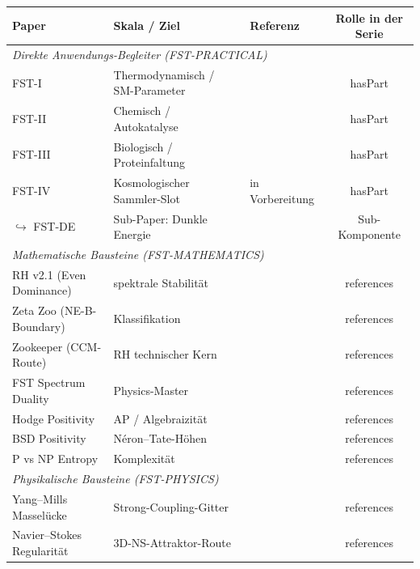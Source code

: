 \documentclass[11pt,a4paper]{article}
\theoremstyle{remark}
\begin{document}
\begin{table}[h]
\centering
\renewcommand{\arraystretch}{1.18}
\small
\begin{tabular}{lllc}
\toprule
\textbf{Paper} & \textbf{Skala / Ziel} & \textbf{Referenz} &
\textbf{Rolle in der Serie} \\
\midrule
\multicolumn{4}{l}{\textit{Direkte Anwendungs-Begleiter (FST-PRACTICAL)}} \\
FST-I   & Thermodynamisch / SM-Parameter      & \cite{GeigerFST-I-2026}     & hasPart \\
FST-II  & Chemisch / Autokatalyse             & \cite{GeigerFST-II-2026}    & hasPart \\
FST-III & Biologisch / Proteinfaltung         & \cite{GeigerFST-III-2026}   & hasPart \\
FST-IV  & Kosmologischer Sammler-Slot         & in Vorbereitung             & hasPart \\
\quad $\hookrightarrow$ FST-DE & Sub-Paper: Dunkle Energie & \cite{GeigerFST-DE-2026} & Sub-Komponente \\
\midrule
\multicolumn{4}{l}{\textit{Mathematische Bausteine (FST-MATHEMATICS)}} \\
RH v2.1 (Even Dominance)        & spektrale Stabilität    & \cite{GeigerRH-EvenDom-2026} & references \\
Zeta Zoo (NE-B-Boundary)        & Klassifikation          & \cite{GeigerZetaZoo-2026}    & references \\
Zookeeper (CCM-Route)           & RH technischer Kern     & \cite{GeigerZookeeper-2026}  & references \\
FST Spectrum Duality            & Physics-Master          & \cite{GeigerSpectrumDuality-2026} & references \\
Hodge Positivity                & AP / Algebraizität      & \cite{GeigerHodge-2026}      & references \\
BSD Positivity                  & Néron--Tate-Höhen       & \cite{GeigerBSD-2026}        & references \\
P vs NP Entropy                 & Komplexität             & \cite{GeigerPvsNP-2026}      & references \\
\midrule
\multicolumn{4}{l}{\textit{Physikalische Bausteine (FST-PHYSICS)}} \\
Yang--Mills Masselücke          & Strong-Coupling-Gitter  & \cite{GeigerYM-2026}         & references \\
Navier--Stokes Regularität      & 3D-NS-Attraktor-Route   & \cite{GeigerNS-2026}         & references \\

\end{tabular}
\end{table}
\end{document}
